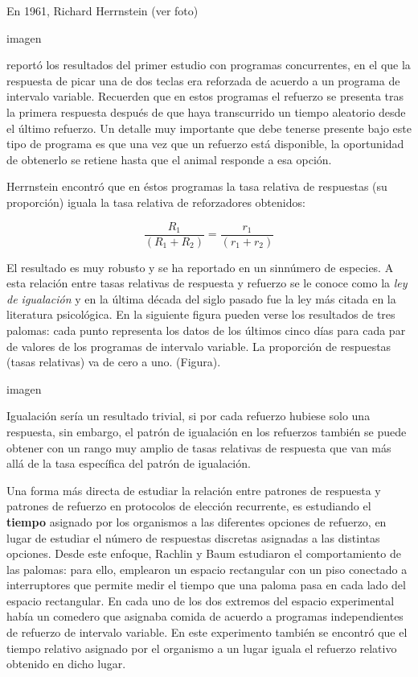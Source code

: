 \documentclass[
  a4paper,
  DIV=11,
  numbers=noendperiod]{scrreprt}
\begin{document}
En 1961, Richard Herrnstein (ver foto)

imagen

reportó los resultados del primer estudio con programas concurrentes, en
el que la respuesta de picar una de dos teclas era reforzada de acuerdo
a un programa de intervalo variable. Recuerden que en estos programas el
refuerzo se presenta tras la primera respuesta después de que haya
transcurrido un tiempo aleatorio desde el último refuerzo. Un detalle
muy importante que debe tenerse presente bajo este tipo de programa es
que una vez que un refuerzo está disponible, la oportunidad de obtenerlo
se retiene hasta que el animal responde a esa opción.

Herrnstein encontró que en éstos programas la tasa relativa de
respuestas (su proporción) iguala la tasa relativa de reforzadores
obtenidos:

\[\frac {R_1} {(R_1 + R_2)} = \frac {r_1} {(r_1 + r_2)}\]

El resultado es muy robusto y se ha reportado en un sinnúmero de
especies. A esta relación entre tasas relativas de respuesta y refuerzo
se le conoce como la \emph{ley de igualación} y en la última década del
siglo pasado fue la ley más citada en la literatura psicológica. En la
siguiente figura pueden verse los resultados de tres palomas: cada punto
representa los datos de los últimos cinco días para cada par de valores
de los programas de intervalo variable. La proporción de respuestas
(tasas relativas) va de cero a uno. (Figura).

imagen

Igualación sería un resultado trivial, si por cada refuerzo hubiese solo
una respuesta, sin embargo, el patrón de igualación en los refuerzos
también se puede obtener con un rango muy amplio de tasas relativas de
respuesta que van más allá de la tasa específica del patrón de
igualación.

Una forma más directa de estudiar la relación entre patrones de
respuesta y patrones de refuerzo en protocolos de elección recurrente,
es estudiando el \textbf{tiempo} asignado por los organismos a las
diferentes opciones de refuerzo, en lugar de estudiar el número de
respuestas discretas asignadas a las distintas opciones. Desde este
enfoque, Rachlin y Baum estudiaron el comportamiento de las palomas:
para ello, emplearon un espacio rectangular con un piso conectado a
interruptores que permite medir el tiempo que una paloma pasa en cada
lado del espacio rectangular. En cada uno de los dos extremos del
espacio experimental había un comedero que asignaba comida de acuerdo a
programas independientes de refuerzo de intervalo variable. En este
experimento también se encontró que el tiempo relativo asignado por el
organismo a un lugar iguala el refuerzo relativo obtenido en dicho
lugar.
\end{document}
